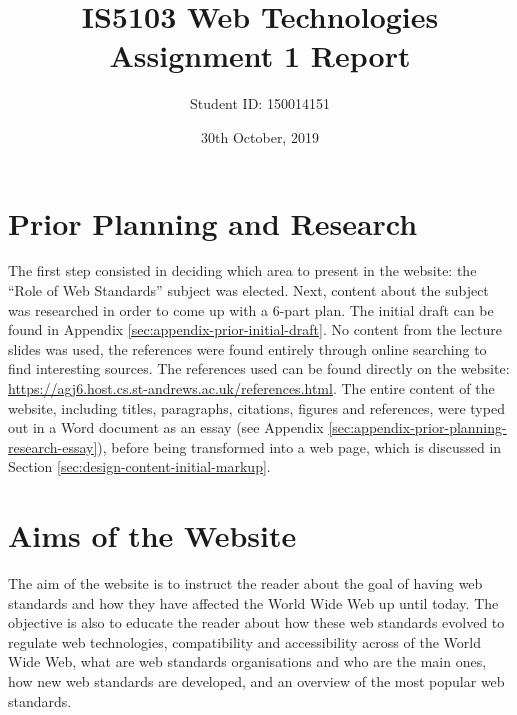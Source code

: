 \documentclass[letterpaper,12pt]{article}
\begin{document}
\title{IS5103 Web Technologies\\Assignment 1 Report}
\author{Student ID: 150014151}
\date{30th October, 2019}
\maketitle
\newpage

\tableofcontents
\newpage


\section{Prior Planning and Research}
\label{sec:prior-planning-research}

The first step consisted in deciding which area to present in the website: the ``Role of Web Standards'' subject was elected. Next, content about the subject was researched in order to come up with a 6-part plan. The initial draft can be found in Appendix \ref{sec:appendix-prior-initial-draft}. No content from the lecture slides was used, the references were found entirely through online searching to find interesting sources. The references used can be found directly on the website: \url{https://agj6.host.cs.st-andrews.ac.uk/references.html}. The entire content of the website, including titles, paragraphs, citations, figures and references, were typed out in a Word document as an essay (see Appendix \ref{sec:appendix-prior-planning-research-essay}), before being transformed into a web page, which is discussed in Section \ref{sec:design-content-initial-markup}.


\section{Aims of the Website}
\label{sec:aims}

The aim of the website is to instruct the reader about the goal of having web standards and how they have affected the World Wide Web up until today. The objective is also to educate the reader about how these web standards evolved to regulate web technologies, compatibility and accessibility across of the World Wide Web, what are web standards organisations and who are the main ones, how new web standards are developed, and an overview of the most popular web standards.
\end{document}
